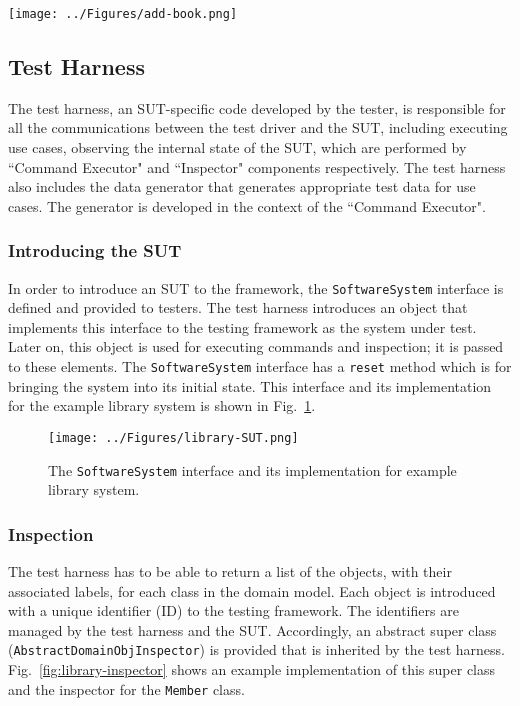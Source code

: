 \begin{figure*}[h]
\centering
\texttt{[image: ../Figures/add-book.png]}
\caption{Using the data types and their partitioning in use case modelling.}
\label{fig:library-usecase-add-book}
\end{figure*}

\subsection{Test Harness}
\label{sec:create-test model-test-harness}
The test harness, an SUT-specific code developed by the tester, is responsible for all the communications between the test driver and the SUT, including executing use cases, observing the internal state of the SUT, which are performed by ``Command Executor" and ``Inspector" components respectively.
The test harness also includes the data generator that generates appropriate test data for use cases. The generator is developed in the context of the ``Command Executor".

\subsubsection{Introducing the SUT}
\label{sec:test-harness-intro-SUT}
In order to introduce an SUT to the framework, the \texttt{SoftwareSystem} interface is defined and provided to testers. The test harness introduces an object that implements this interface to the testing framework as the system under test. Later on, this object is used for executing commands and inspection; it is passed to these elements. The \texttt{SoftwareSystem} interface has a \texttt{reset} method which is for bringing the system into its initial state. This interface and its implementation for the example library system is shown in Fig.~\ref{fig:library-SUT}.

\begin{figure}[h]
\centering
\texttt{[image: ../Figures/library-SUT.png]}
\caption{The \texttt{SoftwareSystem} interface and its implementation for example library system.}
\label{fig:library-SUT}
\end{figure}


\subsubsection{Inspection}
\label{sec:test-harness-inspection}
The test harness has to be able to return a list of the objects, with their associated labels, for each class in the domain model. Each object is introduced with a unique identifier (ID) to the testing framework. The identifiers are managed by the test harness and the SUT. Accordingly, an abstract super class (\texttt{AbstractDomainObjInspector})  is provided that is inherited by the test harness. Fig.~\ref{fig:library-inspector} shows an example implementation of this super class and the inspector for the \texttt{Member} class.

